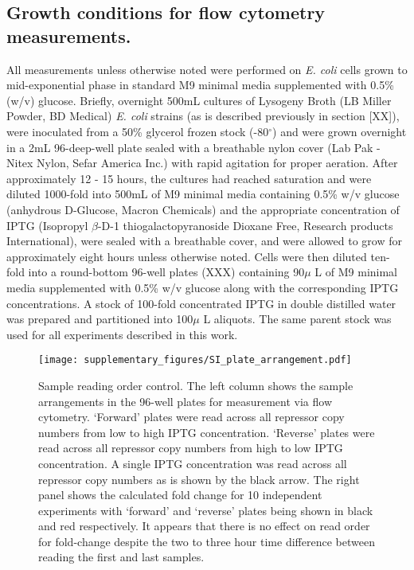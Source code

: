 \subsection*{Growth conditions for flow cytometry measurements.}
All measurements unless otherwise noted were performed on \textit{E. coli}
cells grown to mid-exponential phase in standard M9 minimal media supplemented
with 0.5\% (w/v) glucose. Briefly, overnight 500mL cultures of Lysogeny Broth
(LB Miller Powder, BD Medical) \textit{E. coli} strains (as is described
previously in section [XX]), were inoculated from a 50\% glycerol frozen stock
(-80$^\circ$) and were grown overnight in a 2mL 96-deep-well plate sealed with
a breathable nylon cover (Lab Pak - Nitex Nylon, Sefar America Inc.) with rapid
agitation for proper aeration. After approximately 12 - 15 hours, the cultures
had reached saturation and were diluted 1000-fold into 500mL of M9 minimal
media containing 0.5\% w/v glucose (anhydrous D-Glucose, Macron Chemicals) and
the appropriate concentration of IPTG (Isopropyl $\beta$-D-1
thiogalactopyranoside Dioxane Free, Research products International), were
sealed with a breathable cover, and were allowed to grow for approximately
eight hours unless otherwise noted. Cells were then diluted ten-fold into a
round-bottom 96-well plates (XXX) containing 90$\mu$ L of M9 minimal media
supplemented with 0.5\% w/v glucose along with the corresponding IPTG
concentrations. A stock of 100-fold concentrated IPTG in double distilled water
was prepared and partitioned into 100$\mu$ L aliquots. The same parent stock
was used for all experiments described in this work.


\begin{figure}[h]
\centering
	\texttt{[image: supplementary\_figures/SI\_plate\_arrangement.pdf]}
	\caption{{Sample reading order control}. The left column shows the sample
	arrangements in the 96-well plates for measurement via flow cytometry.
	`Forward'	plates were read across all repressor copy numbers from low to high
	IPTG concentration. `Reverse' plates were read across all repressor copy
	numbers from high to low IPTG concentration. A single IPTG concentration was
	read across all repressor copy numbers as is shown by the black arrow. The
	right panel shows the calculated fold change for 10 independent experiments
	with `forward' and `reverse' plates being shown in black and red
	respectively. It appears that there is no effect on read order for
	fold-change despite the two to three hour time difference between reading the
	first and last samples. } \label{platerev}
\end{figure}

